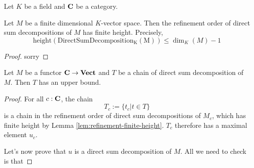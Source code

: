 Let $K$ be a field and ${\normalfont\textbf{C}}$ be a category.

\begin{lem}\label{lem:refinement-finite-height}
  Let $M$ be a finite dimensional $K$-vector space. Then the refinement order of direct sum decompositions of $M$ has finite height. Precisely,
  $$\mathrm{height}(\mathrm{DirectSumDecomposition_K(M)}) \le \dim_K(M) - 1$$
\end{lem}
\begin{proof}
  sorry
\end{proof}

\begin{prop}
  Let $M$ be a functor ${\normalfont\textbf{C}} \to {\normalfont\textbf{Vect}}$ and $T$ be a chain of direct sum decomposition of $M$. Then $T$ has an upper bound.
\end{prop}
\begin{proof}
  For all $c : {\normalfont\textbf{C}}$, the chain
  $$T_c := \{t_c | t \in T\}$$
  is a chain in the refinement order of direct sum decompositions of $M_c$, which has finite height by Lemma \ref{lem:refinement-finite-height}. $T_c$ therefore has a maximal element $u_c$.

  Let's now prove that $u$ is a direct sum decomposition of $M$. All we need to check is that 
\end{proof}